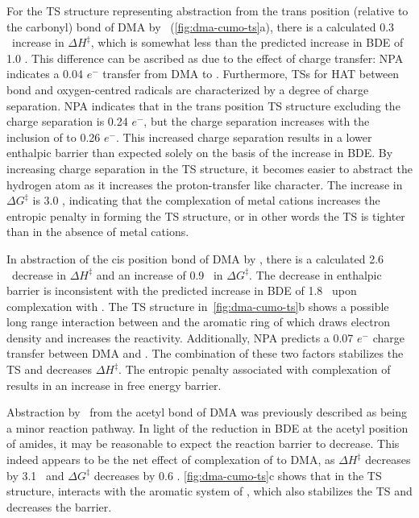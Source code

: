 For the TS structure representing abstraction from the trans position (relative to the carbonyl)  bond of DMA by \cumo\ (\ref{fig:dma-cumo-ts}a), there is a calculated 0.3 \kcalmol\ increase in $\Delta H^\ddagger$, which is somewhat less than the predicted increase in BDE of 1.0 \kcalmol. This difference can be ascribed as due to the effect of charge transfer: NPA indicates a 0.04 $e^-$ transfer from DMA to . Furthermore, TSs for HAT between  bond and oxygen-centred radicals are characterized by a degree of charge separation.\cite{Roberts1999} NPA indicates that in the trans position TS structure excluding  the charge separation is 0.24 $e^-$, but the charge separation increases with the inclusion of  to 0.26 $e^-$. This increased charge separation results in a lower enthalpic barrier than expected solely on the basis of the increase in  BDE. By increasing charge separation in the TS structure, it becomes easier to abstract the hydrogen atom as it increases the proton-transfer like character. The increase in $\Delta G^\ddagger$ is 3.0 \kcalmol, indicating that the complexation of metal cations increases the entropic penalty in forming the TS structure, or in other words the TS is tighter than in the absence of metal cations.

In abstraction of the cis position  bond of DMA by \cumo, there is a calculated 2.6 \kcalmol\ decrease in $\Delta H^\ddagger$ and an increase of 0.9 \kcalmol\ in $\Delta G^\ddagger$. The decrease in enthalpic barrier is inconsistent with the predicted increase in BDE of 1.8 \kcalmol\ upon complexation with . The TS structure in~\ref{fig:dma-cumo-ts}b shows a possible long range interaction between  and the aromatic ring of \cumo which draws electron density and increases the reactivity. Additionally, NPA predicts a 0.07 $e^-$ charge transfer between DMA and . The combination of these two factors stabilizes the TS and decreases $\Delta H^\ddagger$. The entropic penalty associated with complexation of  results in an increase in free energy barrier.

Abstraction by \cumo\ from the acetyl  bond of DMA was previously described as being a minor reaction pathway.\cite{Salamone2013} In light of the reduction in BDE at the acetyl position of amides, it may be reasonable to expect the reaction barrier to decrease. This indeed appears to be the net effect of complexation of  to DMA, as $\Delta H^\ddagger$ decreases by 3.1 \kcalmol\ and $\Delta G^\ddagger$ decreases by 0.6 \kcalmol. \ref{fig:dma-cumo-ts}c shows that in the TS structure,  interacts with the aromatic system of \cumo, which also stabilizes the TS and decreases the barrier.

